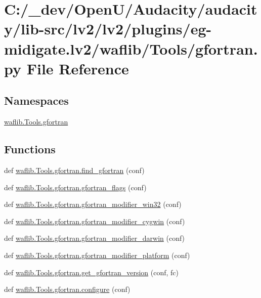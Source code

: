 \hypertarget{lv2_2plugins_2eg-midigate_8lv2_2waflib_2_tools_2gfortran_8py}{}\section{C\+:/\+\_\+dev/\+Open\+U/\+Audacity/audacity/lib-\/src/lv2/lv2/plugins/eg-\/midigate.lv2/waflib/\+Tools/gfortran.py File Reference}
\label{lv2_2plugins_2eg-midigate_8lv2_2waflib_2_tools_2gfortran_8py}
\subsection*{Namespaces}
\begin{DoxyCompactItemize}
\item 
 \hyperlink{namespacewaflib_1_1_tools_1_1gfortran}{waflib.\+Tools.\+gfortran}
\end{DoxyCompactItemize}
\subsection*{Functions}
\begin{DoxyCompactItemize}
\item 
def \hyperlink{namespacewaflib_1_1_tools_1_1gfortran_a831f2f61b251e9981867542649f2339d}{waflib.\+Tools.\+gfortran.\+find\+\_\+gfortran} (conf)
\item 
def \hyperlink{namespacewaflib_1_1_tools_1_1gfortran_a08762d92086757a2af5414ff6aef84e9}{waflib.\+Tools.\+gfortran.\+gfortran\+\_\+flags} (conf)
\item 
def \hyperlink{namespacewaflib_1_1_tools_1_1gfortran_ad22cc6d0d2b302315d031dcb2c035c49}{waflib.\+Tools.\+gfortran.\+gfortran\+\_\+modifier\+\_\+win32} (conf)
\item 
def \hyperlink{namespacewaflib_1_1_tools_1_1gfortran_abf2215270c976ac6aa31055132d201a6}{waflib.\+Tools.\+gfortran.\+gfortran\+\_\+modifier\+\_\+cygwin} (conf)
\item 
def \hyperlink{namespacewaflib_1_1_tools_1_1gfortran_a3124f50b1bc53ecd3fafbcf79f296414}{waflib.\+Tools.\+gfortran.\+gfortran\+\_\+modifier\+\_\+darwin} (conf)
\item 
def \hyperlink{namespacewaflib_1_1_tools_1_1gfortran_af3b109053ce35738f8f717bbd9eb4076}{waflib.\+Tools.\+gfortran.\+gfortran\+\_\+modifier\+\_\+platform} (conf)
\item 
def \hyperlink{namespacewaflib_1_1_tools_1_1gfortran_a9d31db08b155f317bf0b19a8c1f72b57}{waflib.\+Tools.\+gfortran.\+get\+\_\+gfortran\+\_\+version} (conf, fc)
\item 
def \hyperlink{namespacewaflib_1_1_tools_1_1gfortran_acd792ef8a96cbe13a82a54ce98896db5}{waflib.\+Tools.\+gfortran.\+configure} (conf)
\end{DoxyCompactItemize}
